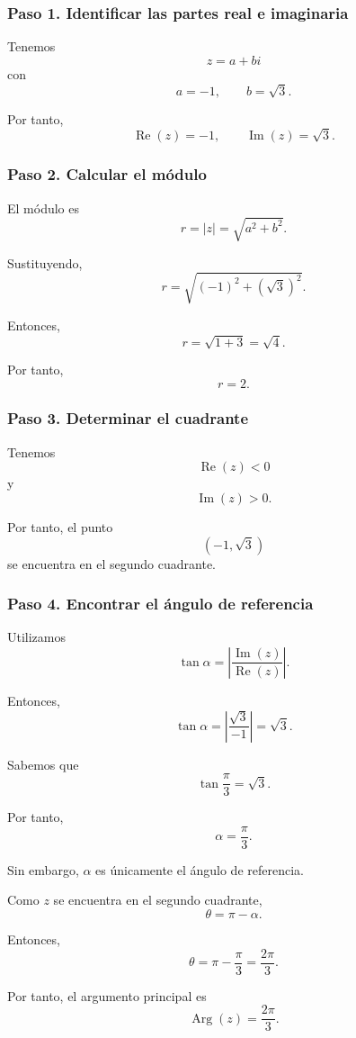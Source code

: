 \documentclass[12pt]{article}
\begin{document}
\subsubsection*{Paso 1. Identificar las partes real e imaginaria}

Tenemos
\[
z=a+bi
\]
con
\[
a=-1,
\qquad
b=\sqrt3.
\]

Por tanto,
\[
\operatorname{Re}(z)=-1,
\qquad
\operatorname{Im}(z)=\sqrt3.
\]

\subsubsection*{Paso 2. Calcular el módulo}

El módulo es
\[
r=|z|
=
\sqrt{a^2+b^2}.
\]

Sustituyendo,
\[
r
=
\sqrt{(-1)^2+(\sqrt3)^2}.
\]

Entonces,
\[
r
=
\sqrt{1+3}
=
\sqrt4.
\]

Por tanto,
\[
\boxed{r=2}.
\]

\subsubsection*{Paso 3. Determinar el cuadrante}

Tenemos
\[
\operatorname{Re}(z)<0
\]
y
\[
\operatorname{Im}(z)>0.
\]

Por tanto, el punto
\[
(-1,\sqrt3)
\]
se encuentra en el segundo cuadrante.

\subsubsection*{Paso 4. Encontrar el ángulo de referencia}

Utilizamos
\[
\tan\alpha
=
\left|
\frac{\operatorname{Im}(z)}
     {\operatorname{Re}(z)}
\right|.
\]

Entonces,
\[
\tan\alpha
=
\left|
\frac{\sqrt3}{-1}
\right|
=
\sqrt3.
\]

Sabemos que
\[
\tan\frac{\pi}{3}
=
\sqrt3.
\]

Por tanto,
\[
\alpha=\frac{\pi}{3}.
\]

Sin embargo, $\alpha$ es únicamente el ángulo de referencia.

Como $z$ se encuentra en el segundo cuadrante,
\[
\theta=\pi-\alpha.
\]

Entonces,
\[
\theta
=
\pi-\frac{\pi}{3}
=
\frac{2\pi}{3}.
\]

Por tanto, el argumento principal es
\[
\boxed{
\operatorname{Arg}(z)=\frac{2\pi}{3}
}.
\]
\end{document}
